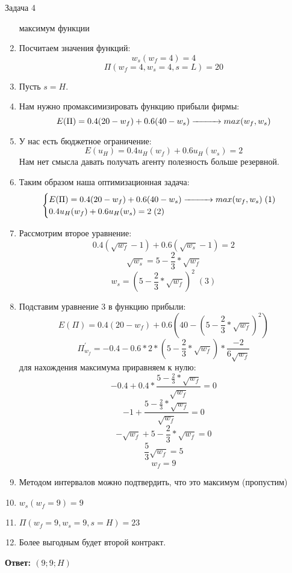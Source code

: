 \begin{mybox}{Задача 4}
\begin{enumerate}
        максимум функции
        \item Посчитаем значения функций: $$w_s(w_f=4)=4$$
        $$\Pi(w_f=4, w_s=4, s=L)=20$$
        \item Пусть $s=H$.
        \item Нам нужно промаксимизировать функцию прибыли фирмы: $$E(\Pi)=0.4(20-w_f)+0.6(40-w_s)\xrightarrow{\makebox[1cm]{}} max(w_f,w_s)$$
        \item У нас есть бюджетное ограничение: $$E(u_H)=0.4u_H(w_f)+0.6u_H(w_s)=2$$ Нам нет смысла давать получать
        агенту полезность больше резервной.
        \item Таким образом наша оптимизационная задача: $$\begin{cases}
            E(\Pi)=0.4(20-w_f)+0.6(40-w_s)\xrightarrow{\makebox[1cm]{}} max(w_f,w_s) \;(1)\\
            0.4u_H(w_f)+0.6u_H(w_s)=2\; (2) \\
        \end{cases}$$
        \item Рассмотрим второе уравнение: $$0.4(\sqrt{w_f}-1)+0.6(\sqrt{w_s}-1)=2$$
        $$\sqrt{w_s}=5-\frac{2}{3}*\sqrt{w_f}$$
        $$w_s=(5-\frac{2}{3}*\sqrt{w_f})^2\;(3)$$
        \item Подставим уравнение 3 в функцию прибыли: $$E(\Pi)=0.4(20-w_f)+0.6(40-(5-\frac{2}{3}*\sqrt{w_f})^2)$$
        $$\Pi^{'}_{w_f}=-0.4-0.6*2*(5-\frac{2}{3}*\sqrt{w_f})*\frac{-2}{6\sqrt{w_f}}$$ для нахождения максимума
        приравняем к нулю:
        $$-0.4+0.4*\frac{5-\frac{2}{3}*\sqrt{w_f}}{\sqrt{w_f}}=0$$
        $$-1+\frac{5-\frac{2}{3}*\sqrt{w_f}}{\sqrt{w_f}}=0$$
        $$-\sqrt{w_f}+5-\frac{2}{3}*\sqrt{w_f}=0$$
        $$\frac{5}{3}\sqrt{w_f}=5$$
        $$w_f=9$$
        \item Методом интервалов можно подтвердить, что это максимум (пропустим)
        \item $w_s(w_f=9)=9$
        \item $\Pi(w_f=9, w_s=9, s=H)=23$
        \item Более выгодным будет второй контракт.
    \end{enumerate}
    \textbf{Ответ: $(9;9;H)$}\\\\


\end{mybox}
